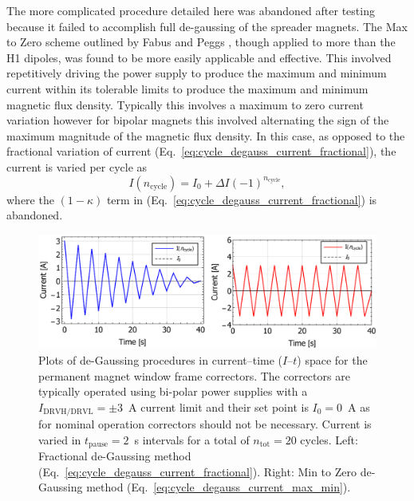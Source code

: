 \documentclass[../main.tex]{subfiles}
\begin{document}
The more complicated procedure detailed here was abandoned after testing because it failed to accomplish full de-gaussing of the spreader magnets. The Max to Zero scheme outlined by Fabus and Peggs \cite{fabus2019hysteresis}, though applied to more than the H1 dipoles, was found to be more easily applicable and effective. This involved repetitively driving the power supply to produce the maximum and minimum current within its tolerable limits to produce the maximum and minimum magnetic flux density. Typically this involves a maximum to zero current variation however for bipolar magnets this involved alternating the sign of the maximum magnitude of the magnetic flux density. In this case, as opposed to the fractional variation of current (Eq.~\ref{eq:cycle_degauss_current_fractional}), the current is varied per cycle as
\begin{equation}
I\left(n_{\mathrm{cycle}}\right) =  I_{0}+\Delta I\left(-1\right)^{n_{\mathrm{cycle}}},
\label{eq:cycle_degauss_current_max_min}
\end{equation}
where the $\left(1-\kappa\right)$ term in (Eq.~\ref{eq:cycle_degauss_current_fractional}) is abandoned.

\begin{figure}[!h]
\centering
\includegraphics[width=\textwidth]{Figures/CBETA_Multi-Pass_Commissioning/degauss_current_time_corrector.pdf}
\caption{Plots of de-Gaussing procedures in current--time ($I$--$t$) space for the permanent magnet window frame correctors. The correctors are typically operated using bi-polar power supplies with a $I_{\mathrm{DRVH/DRVL}}=\pm3$~\si{\ampere} current limit and their set point is $I_{0}=0$~\si{\ampere} as for nominal operation correctors should not be necessary. Current is varied in $t_{\mathrm{pause}}=2$~\si{\second} intervals for a total of $n_{\mathrm{tot}}=20$ cycles. Left: Fractional de-Gaussing method (Eq.~\ref{eq:cycle_degauss_current_fractional}). Right: Min to Zero de-Gaussing method (Eq.~\ref{eq:cycle_degauss_current_max_min}). }
\label{fig:corrector_degauss_procedure}
\end{figure}
\end{document}
